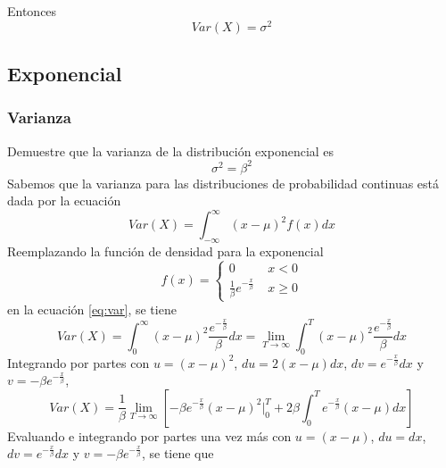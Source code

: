 \documentclass[12pt]{article}
\begin{document}
            Entonces
            \begin{equation}
            	Var(X)=\sigma^2
            \end{equation}
            
  		\subsection{Exponencial}
        	\subsubsection{Varianza}
        	Demuestre que la varianza de la distribución exponencial es
        	\begin{equation}
            	\sigma^2 = \beta^2
            \end{equation}
            \newpage Sabemos que la varianza para las distribuciones de probabilidad continuas está dada por la ecuación
            \begin{equation}
            \label{eq:var}
            	Var(X)=\int_{-\infty }^{\infty }{\left( x-\mu  \right)^{2}f\left( x \right)dx}
            \end{equation}
            Reemplazando la función de densidad para la exponencial
			\begin{equation}
            	f\left( x \right)=\left\{\begin{array}{cc} 0 & x<0 \\ \frac{1}{\beta }e^{-\frac{x}{\beta }}\;  & x\geq 0 \end{array}\right.
            \end{equation}
            en la ecuación \ref{eq:var}, se tiene
            \begin{equation*}
            	Var(X)=\int_{0 }^{\infty }{\left( x-\mu  \right)^{2}\frac{e^{-\frac{x}{\beta}}}{\beta}dx} = \lim_{T \rightarrow \infty}\int_{0 }^{T }{\left( x-\mu  \right)^{2}\frac{e^{-\frac{x}{\beta}}}{\beta}dx}
            \end{equation*}
			Integrando por partes con $u=(x-\mu)^2$, $du=2(x-\mu)dx$, $dv=e^{-\frac{x}{\beta}}dx$ y $v=-\beta e^{-\frac{x}{\beta}}$,
            \begin{equation*}
            	Var(X)=\frac{1}{\beta}\lim_{T \rightarrow \infty}\left[ -\beta e^{-\frac{x}{\beta}}(x-\mu )^{ 2 } \bigg|_0^T + 2\beta\int_{0}^{T}{e^{-\frac{x}{\beta}}(x-\mu)dx}\right]
            \end{equation*}
            Evaluando e integrando por partes una vez más con $u=(x-\mu)$, $du=dx$, $dv=e^{-\frac{x}{\beta}}dx$ y $v=-\beta e^{-\frac{x}{\beta}}$, se tiene que
\end{document}
